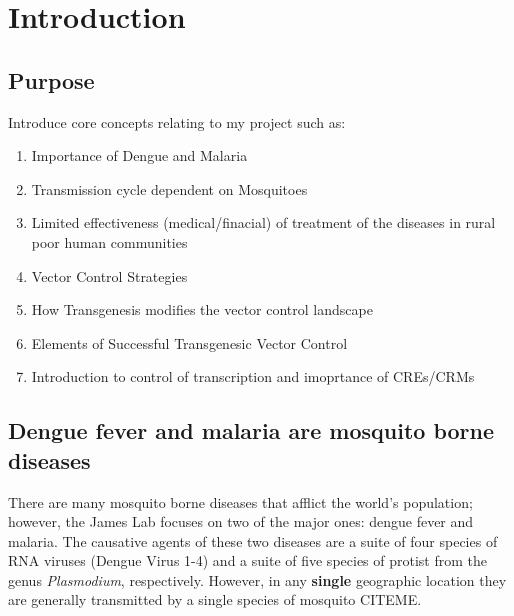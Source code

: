 \chapter{Introduction}

\section{Purpose}

Introduce core concepts relating to my project such as:

\begin{enumerate}
\item Importance of Dengue and Malaria
\item Transmission cycle dependent on Mosquitoes
\item Limited effectiveness (medical/finacial) of treatment of the diseases in rural poor human communities
\item Vector Control Strategies
\item How Transgenesis modifies the vector control landscape
\item Elements of Successful Transgenesic Vector Control
\item Introduction to control of transcription and imoprtance of \glspl{CRE}/\glspl{CRM}
\end{enumerate}


\section{Dengue fever and malaria are mosquito borne diseases}


There are many mosquito borne diseases that afflict the world's population; \alert{however, the James Lab focuses on two of the major ones: dengue fever and malaria}.
The causative agents of these two diseases are a suite of four species of RNA viruses (Dengue Virus 1-4) and a suite of five species of protist from the genus \textit{Plasmodium}, respectively.
However, in any \textbf{single} geographic location they are generally transmitted by a single species of mosquito \alert{CITEME}. 

